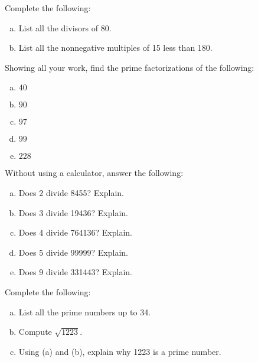 \documentclass[11pt,letterpaper]{article}
\begin{document}

 Complete the following:
	\begin{enumerate}[(a)]
	\item List all the divisors of 80.
	\item List all the nonnegative multiples of 15 less than 180. 
	\end{enumerate}



\newpage



 Showing all your work, find the prime factorizations of the following:
	\begin{enumerate}[(a)]
	\item $40$
	\item $90$
	\item $97$
	\item $99$
	\item $228$
	\end{enumerate}



\newpage



 Without using a calculator, answer the following:
	\begin{enumerate}[(a)]
	\item Does 2 divide 8455? Explain.
	\item Does 3 divide 19436? Explain.
	\item Does 4 divide 764136? Explain.
	\item Does 5 divide 99999? Explain.
	\item Does 9 divide 331443? Explain. 
	\end{enumerate}



\newpage



 Complete the following:
	\begin{enumerate}[(a)]
	\item List all the prime numbers up to 34.
	\item Compute $\sqrt{1223}$.
	\item Using (a) and (b), explain why 1223 is a prime number. 
	\end{enumerate}
\end{document}

